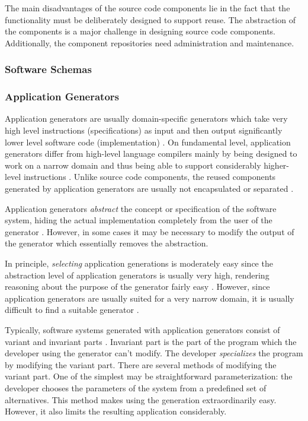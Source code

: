 The main disadvantages of the source code components lie in the fact that the functionality must be deliberately designed to support reuse. The abstraction of the components is a major challenge \citep[chap.~5]{krueger_software_1992} in designing source code components. Additionally, the component repositories need administration and maintenance.

\subsubsection{Software Schemas}


\subsubsection{Application Generators}

Application generators are usually domain-specific generators which take very high level instructions (specifications) as input and then output significantly lower level software code (implementation) \citep[chap.~7]{cleaveland_building_1988,krueger_software_1992}. On fundamental level, application generators differ from high-level language compilers mainly by being designed to work on a narrow domain and thus being able to support considerably higher-level instructions \citep[chap.~7]{krueger_software_1992}. Unlike source code components, the reused components generated by application generators are usually not encapsulated or separated \citep[chap.~3]{sametinger_software_1997}.

Application generators \emph{abstract} the concept or specification of the software system, hiding the actual implementation completely from the user of the generator \citep{cleaveland_building_1988}. However, in some cases it may be necessary to modify the output of the generator which essentially removes the abstraction.

In principle, \emph{selecting} application generations is moderately easy since the abstraction level of application generators is usually very high, rendering reasoning about the purpose of the generator fairly easy \citep[chap.~7]{krueger_software_1992}. However, since application generators are usually suited for a very narrow domain, it is usually difficult to find a suitable generator \citep[chap.~7]{krueger_software_1992}.

Typically, software systems generated with application generators consist of variant and invariant parts \citep[chap.~7]{krueger_software_1992}. Invariant part is the part of the program which the developer using the generator can't modify. The developer \emph{specializes} the program by modifying the variant part. There are several methods of modifying the variant part. One of the simplest may be straightforward parameterization: the developer chooses the parameters of the system from a predefined set of alternatives. This method makes using the generation extraordinarily easy. However, it also limits the resulting application considerably.

